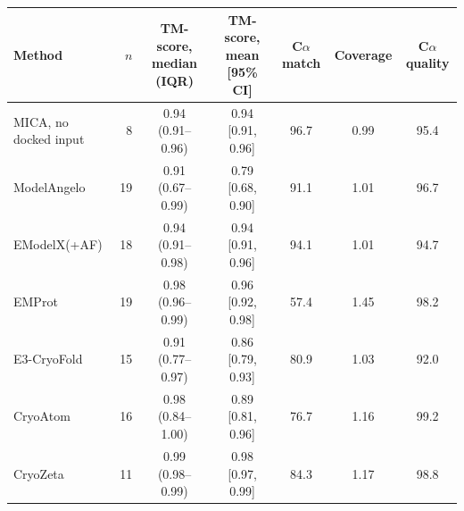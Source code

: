 \begin{tabular}{lrccccc}
\toprule
Method & $n$ & TM-score, median (IQR) & TM-score, mean [95\% CI] & C$\alpha$ match & Coverage & C$\alpha$ quality \\
\midrule
MICA, no docked input & 8 & 0.94 (0.91--0.96) & 0.94 [0.91, 0.96] & 96.7 & 0.99 & 95.4 \\
ModelAngelo & 19 & 0.91 (0.67--0.99) & 0.79 [0.68, 0.90] & 91.1 & 1.01 & 96.7 \\
EModelX(+AF) & 18 & 0.94 (0.91--0.98) & 0.94 [0.91, 0.96] & 94.1 & 1.01 & 94.7 \\
EMProt & 19 & 0.98 (0.96--0.99) & 0.96 [0.92, 0.98] & 57.4 & 1.45 & 98.2 \\
E3-CryoFold & 15 & 0.91 (0.77--0.97) & 0.86 [0.79, 0.93] & 80.9 & 1.03 & 92.0 \\
CryoAtom & 16 & 0.98 (0.84--1.00) & 0.89 [0.81, 0.96] & 76.7 & 1.16 & 99.2 \\
CryoZeta & 11 & 0.99 (0.98--0.99) & 0.98 [0.97, 0.99] & 84.3 & 1.17 & 98.8 \\
\bottomrule
\end{tabular}

